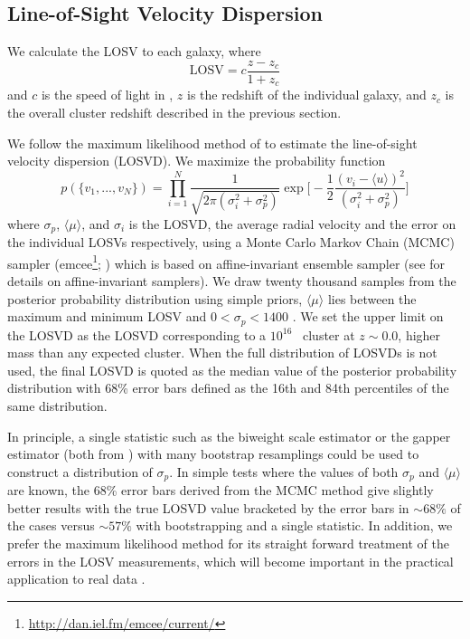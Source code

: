 \documentclass[fleqn,usenatbib]{mnras}
\begin{document}
\subsection{Line-of-Sight Velocity Dispersion}\label{sec: LOSVD}
We calculate the LOSV to each galaxy, where
\begin{equation}
	\mathrm{LOSV} = c\frac{z - z_c}{1+z_c}
\end{equation}
and $c$ is the speed of light in \kms, $z$ is the redshift of the individual galaxy, and $z_c$ is the overall cluster redshift described in the previous section.

We follow the maximum likelihood method of \cite{Walk2006} to estimate the line-of-sight velocity dispersion (LOSVD). We maximize the probability function 
\begin{equation}\label{eq: jointGaussian}
p(\{v_1, ..., v_N\})=\displaystyle\prod_{i=1}^{N}\frac{1}{\sqrt{2\pi(\sigma_i^2+\sigma_p^2)}}\exp\biggl[-\frac{1}{2}\frac{(v_i-\langle u \rangle)^2}{(\sigma_i^2+\sigma_p^2)}\biggr]
\end{equation}
where $\sigma_p$, $\langle\mu\rangle$, and $\sigma_i$ is the LOSVD, the average radial velocity and the error on the individual LOSVs respectively, using a Monte Carlo Markov Chain (MCMC) sampler ({\sc emcee}\footnote{\url{http://dan.iel.fm/emcee/current/}}; \citealt{Foreman-Mackey2013}) which is based on affine-invariant ensemble sampler (see \citealt{Goodman2010} for details on affine-invariant samplers). We draw twenty thousand samples from the posterior probability distribution using simple priors, $\langle\mu\rangle$ lies between the maximum and minimum LOSV and $0< \sigma_p < 1400$ \kms. We set the upper limit on the LOSVD as the LOSVD corresponding to a $10^{16}$ \Msol\ cluster at $z\sim0.0$, higher mass than any expected cluster. When the full distribution of LOSVDs is not used, the final LOSVD is quoted as the median value of the posterior probability distribution with 68\% error bars defined as the 16th and 84th percentiles of the same distribution.

In principle, a single statistic such as the biweight scale estimator or the gapper estimator (both from \citealt{Beers1990}) with many bootstrap resamplings could be used to construct a distribution of $\sigma_p$. In simple tests where the values of both $\sigma_p$ and $\langle\mu\rangle$ are known, the 68\% error bars derived from the MCMC method give slightly better results with the true LOSVD value bracketed by the error bars in $\sim68\%$ of the cases versus $\sim57\%$ with bootstrapping and a single statistic. In addition, we prefer the maximum likelihood method for its straight forward treatment of the errors in the LOSV measurements, which will become important in the practical application to real data .
\end{document}
